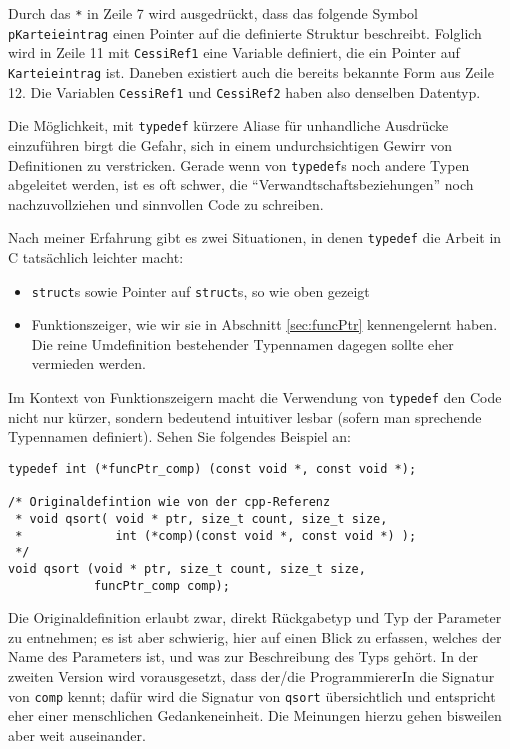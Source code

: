 Durch das \texttt{*} in Zeile 7 wird ausgedrückt, dass das folgende Symbol \texttt{pKarteieintrag} einen Pointer auf die definierte Struktur beschreibt. Folglich wird in Zeile 11 mit \texttt{CessiRef1} eine Variable definiert, die ein Pointer auf \texttt{Karteieintrag} ist. Daneben existiert auch die bereits bekannte Form aus Zeile 12. Die Variablen \texttt{CessiRef1} und \texttt{CessiRef2} haben also denselben Datentyp.

\begin{hintbox}
Die Möglichkeit, mit \texttt{typedef} kürzere Aliase für unhandliche Ausdrücke einzuführen birgt die Gefahr, sich in einem undurchsichtigen Gewirr von Definitionen zu verstricken. Gerade wenn von \texttt{typedef}s noch andere Typen abgeleitet werden, ist es oft schwer, die \enquote{Verwandtschaftsbeziehungen} noch nachzuvollziehen und sinnvollen Code zu schreiben.

Nach meiner Erfahrung gibt es zwei Situationen, in denen \texttt{typedef} die Arbeit in C tatsächlich leichter macht:
\begin{itemize}
\item \texttt{struct}s sowie Pointer auf \texttt{struct}s, so wie oben gezeigt
\item Funktionszeiger, wie wir sie in Abschnitt \ref{sec:funcPtr} kennengelernt haben.
Die reine Umdefinition bestehender Typennamen dagegen sollte eher vermieden werden.
\end{itemize}
\end{hintbox}

\begin{hintbox}[]
Im Kontext von Funktionszeigern macht die Verwendung von \texttt{typedef} den Code nicht nur kürzer, sondern bedeutend intuitiver lesbar (sofern man sprechende Typennamen definiert). Sehen Sie folgendes Beispiel an:

\begin{codebox}
\begin{verbatim}
typedef int (*funcPtr_comp) (const void *, const void *);

/* Originaldefintion wie von der cpp-Referenz
 * void qsort( void * ptr, size_t count, size_t size,
 *             int (*comp)(const void *, const void *) );
 */
void qsort (void * ptr, size_t count, size_t size, 
            funcPtr_comp comp);
\end{verbatim}
\end{codebox}
Die Originaldefinition erlaubt zwar, direkt Rückgabetyp und Typ der Parameter zu entnehmen; es ist aber schwierig, hier auf einen Blick zu erfassen, welches der Name des Parameters ist, und was zur Beschreibung des Typs gehört. In der zweiten Version wird vorausgesetzt, dass der/die ProgrammiererIn die Signatur von \texttt{comp} kennt; dafür wird die Signatur von \texttt{qsort} übersichtlich und entspricht eher einer menschlichen Gedankeneinheit. Die Meinungen hierzu gehen bisweilen aber weit auseinander.
\end{hintbox}

